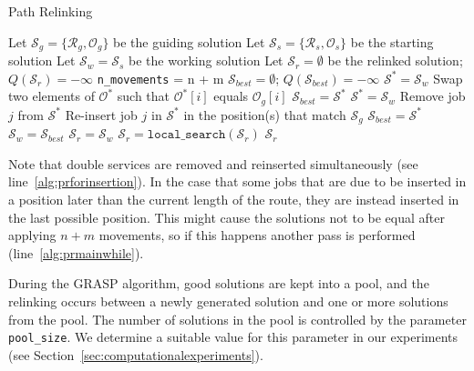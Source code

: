 \documentclass[a4paper,11pt,authoryear]{elsarticle}
\begin{document}
% 
\begin{algorithm}[h]
\caption{Path Relinking}
\label{alg:pathrelinking}
\begin{algorithmic}[1]
\State Let $\mathcal{S}_g = \{\mathcal{R}_g, \mathcal{O}_g\}$ be the guiding solution
\State Let $\mathcal{S}_s = \{\mathcal{R}_s, \mathcal{O}_s\}$ be the starting solution
\State Let $\mathcal{S}_w = \mathcal{S}_s$ be the working solution
\State Let $\mathcal{S}_r = \emptyset$ be the relinked solution;  $Q(\mathcal{S}_r) = -\infty$
\State \texttt{n\_movements} = n + m
 \label{alg:prmainwhile}
		\State $\mathcal{S}_{best} = \emptyset$; $Q(\mathcal{S}_{best}) = -\infty$
			\State $\mathcal{S}^* = \mathcal{S}_w$
				\State Swap two elements of $\mathcal{O}^*$ such that $\mathcal{O}^*[i]$ equals $\mathcal{O}_g[i]$
					\State $\mathcal{S}_{best} = \mathcal{S^*}$
				\EndIf
			\EndIf
		\EndFor %
			\State $\mathcal{S}^* = \mathcal{S}_w$
			\State Remove job $j$ from $\mathcal{S^*}$
			\State Re-insert job $j$ in $\mathcal{S^*}$ in the position(s) that match $\mathcal{S}_g$ \label{alg:prforinsertion}
				\State $\mathcal{S}_{best} = \mathcal{S^*}$
			\EndIf
		\EndFor %
		\State $\mathcal{S}_w = \mathcal{S}_{best}$
			\State $\mathcal{S}_r = \mathcal{S}_w$
		\EndIf
	\EndFor
\EndWhile
\State $\mathcal{S}_r = \texttt{local\_search}(\mathcal{S}_r)$
\Return $\mathcal{S}_r$
\end{algorithmic}
\end{algorithm}

\noindent Note that double services are removed and reinserted simultaneously (see line~\ref{alg:prforinsertion}). In the case that some jobs that are due to be inserted in a position later than the current length of the route, they are instead inserted in the last possible position. This might cause the solutions not to be equal after applying $n + m$ movements, so if this happens another pass is performed (line~\ref{alg:prmainwhile}).

During the GRASP algorithm, good solutions are kept into a pool, and the relinking occurs between a newly generated solution and one or more solutions from the pool.
The number of solutions in the pool is controlled by the parameter \texttt{pool\_size}. We determine a suitable value for this parameter in our experiments (see Section~\ref{sec:computationalexperiments}).
\end{document}
